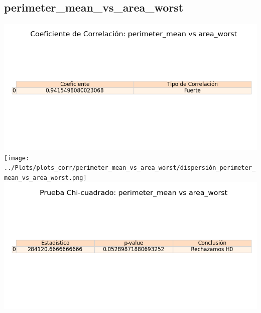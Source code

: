 \documentclass[a4paper, 12pt]{article}
\begin{document}
\subsection{perimeter\_mean\_vs\_area\_worst}
    \includegraphics[width = \textwidth]{../Plots/plots_corr/perimeter_mean_vs_area_worst/coeficiente_correlacion_perimeter_mean_vs_area_worst.png}
    \texttt{[image: ../Plots/plots\_corr/perimeter\_mean\_vs\_area\_worst/dispersión\_perimeter\_mean\_vs\_area\_worst.png]}
    \includegraphics[width = \textwidth]{../Plots/plots_corr/perimeter_mean_vs_area_worst/chi_cuadrado_perimeter_mean_vs_area_worst.png}
\end{document}
